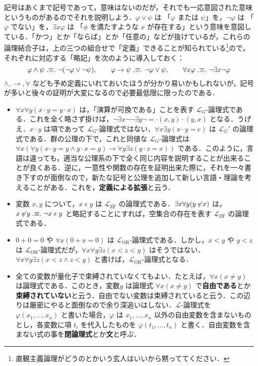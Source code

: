 \documentclass[a4j]{jsarticle}
\newcommand{\defsym}{\mathrel{.\hspace{-2.5pt}\equiv\hspace{-2.5pt}.}}
\begin{document}
記号はあくまで記号であって，意味はないのだが，それでも一応意図された意味というものがあるのでそれを説明しよう．$\varphi \vee \psi$ は 「$\varphi$ または $\psi$」を，$\neg \varphi$ は 「$\varphi$ でない」を，$\exists x \varphi$ は 「$\phi$ を満たすような $x$ が存在する」という意味を意図している．「かつ」とか「ならば」とか「任意の」などが抜けているが，これらの論理結合子は，上の三つの組合せで「定義」できることが知られている\footnote{直観主義論理がどうのとかいう玄人はいいから黙っててください．}ので，それぞれに対応する「略記」を次のように導入しておく：
\[
 \varphi \wedge \psi \defsym \neg (\neg \varphi \vee \neg \psi), \qquad \varphi \rightarrow \psi \defsym \neg \varphi \vee \psi, \qquad
 \forall x \varphi \defsym \neg \exists x \neg \varphi
\]
$\wedge, \rightarrow, \forall$ なども予め定義にいれておいたほうが分かり易いかもしれないが，記号が多いと後々の証明が大変になるので必要最低限に限ったのである．

\begin{example}
 \begin{itemize}
  \item $\forall x \forall y (x \cdot y = y \cdot x)$ は，「演算が可換である」ことを表す $\mathcal{L}_G$-論理式である．これを全く略さず掛けば，$\neg \exists x \neg \neg \exists y \neg = \cdot(x, y) \cdot(y, x)$ となる．うげえ．$x \cdot y$ は項であって $\mathcal{L}_G$-論理式ではない．$\forall x \exists y (x \cdot y = e)$ は $\mathcal{L}_G'$ の論理式である．群の公理の下で，これと同値な $\mathcal{L}_G$-論理式は $\forall x (\forall y (x \cdot y = y \wedge y \cdot x = y) \rightarrow \forall y \exists z (y \cdot z = x))$ である．このように，言語は違っても，適当な公理系の下で全く同じ内容を説明することが出来ることが良くある．逆に，一意性や関数の存在を証明出来た際に，それを一々書き下すのが面倒なので，新たな記号と公理を追加して新しい言語・理論を考えることがある．これを，{\bfseries 定義による拡張}と云う．
  \item 変数 $x, y$ について，$x \mathrel{\epsilon} y$ は $\mathcal{L}_\mathrm{ZF}$ の論理式である．$\exists x \forall y (y \not\mathrel{\epsilon} x)$ は，$x \not\mathrel{\epsilon} y \defsym \neg x \mathrel{\epsilon} y$ と略記することにすれば，空集合の存在を表す $\mathcal{L}_\mathrm{ZF}$ の論理式である．
  \item $0 + 0 = 0$ や $\forall x (0 + x = 0)$ は $\mathcal{L}_\mathrm{OR}$-論理式である．しかし，$x < y$ や $y < z$ は $\mathcal{L}_\mathrm{OR}$-論理式だが，$\forall x \forall y \exists z (x < z < y)$ はそうではない．$\forall x \forall y \exists z (x < z \wedge z < y)$ と書けば，$\mathcal{L}_\mathrm{OR}$-論理式となる．
  \item 全ての変数が量化子で束縛されていなくてもよい．たとえば，$\forall x (x \neq y)$ は論理式である．このとき，変数$y$ は論理式 $\forall x (x \neq y)$ で{\bfseries 自由である}とか{\bfseries 束縛されていない}と云う．自由でない変数は束縛されていると云う．この辺りは厳密にやると面倒なので余り深追いはしない．$\mathcal{L}$-論理式を $\varphi(x_1, \dots, x_n)$ と書いた場合，$\varphi$ は $x_1, \dots, x_n$ 以外の自由変数を含まないものとし，各変数に項 $t_i$ を代入したものを $\varphi(t_1, \dots, t_n)$ と書く．自由変数を含まない式の事を{\bfseries 閉論理式}とか{\bfseries 文}と呼ぶ．
 \end{itemize}
\end{example}
\end{document}
